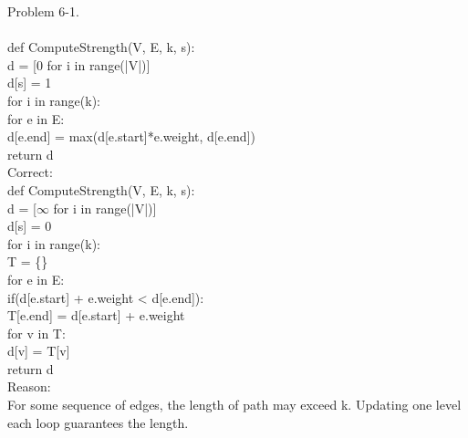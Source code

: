 \documentclass[12pt,twoside]{article}
\begin{document}
Problem 6-1.\\
\\
\hspace*{2em}def ComputeStrength(V, E, k, s):\\
\hspace*{4em}d = [0 for i in range(|V|)]\\
\hspace*{4em}d[s] = 1\\
\hspace*{4em}for i in range(k):\\
\hspace*{6em}for e in E:\\
\hspace*{8em}d[e.end] = max(d[e.start]*e.weight, d[e.end])\\
\hspace*{4em}return d\\
Correct:\\
\hspace*{2em}def ComputeStrength(V, E, k, s):\\
\hspace*{4em}d = [$\infty$ for i in range(|V|)]\\
\hspace*{4em}d[s] = 0\\
\hspace*{4em}for i in range(k):\\
\hspace*{6em}T = \{\}\\
\hspace*{6em}for e in E:\\
\hspace*{8em}if(d[e.start] + e.weight < d[e.end]):\\
\hspace*{10em}T[e.end] = d[e.start] + e.weight\\
\hspace*{6em}for v in T:\\
\hspace*{8em}d[v] = T[v]\\
\hspace*{4em}return d\\
Reason:\\
For some sequence of edges, the length of path may exceed k. Updating one level 
each loop guarantees the length.
\\
\end{document}
